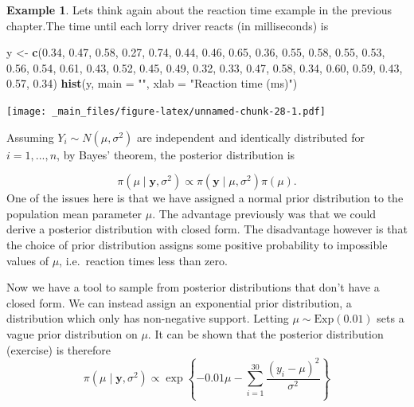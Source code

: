 \documentclass[
]{book}
\newenvironment{Shaded}{\begin{snugshade}}{\end{snugshade}}
\newcommand{\AttributeTok}[1]{\textcolor[rgb]{0.13,0.29,0.53}{#1}}
\newcommand{\FloatTok}[1]{\textcolor[rgb]{0.00,0.00,0.81}{#1}}
\newcommand{\FunctionTok}[1]{\textcolor[rgb]{0.13,0.29,0.53}{\textbf{#1}}}
\newcommand{\NormalTok}[1]{#1}
\newcommand{\OtherTok}[1]{\textcolor[rgb]{0.56,0.35,0.01}{#1}}
\newcommand{\StringTok}[1]{\textcolor[rgb]{0.31,0.60,0.02}{#1}}
\theoremstyle{definition}
\theoremstyle{definition}
\newtheorem{example}{Example}[chapter]
\theoremstyle{definition}
\theoremstyle{definition}
\theoremstyle{remark}
\begin{document}
\begin{example}
\protect\hypertarget{exm:norm}{}\label{exm:norm}Lets think again about the reaction time example in the previous chapter.The time until each lorry driver reacts (in milliseconds) is

\begin{Shaded}
\begin{Highlighting}[]
\NormalTok{y }\OtherTok{\textless{}{-}} \FunctionTok{c}\NormalTok{(}\FloatTok{0.34}\NormalTok{, }\FloatTok{0.47}\NormalTok{, }\FloatTok{0.58}\NormalTok{, }\FloatTok{0.27}\NormalTok{, }\FloatTok{0.74}\NormalTok{, }\FloatTok{0.44}\NormalTok{, }\FloatTok{0.46}\NormalTok{, }\FloatTok{0.65}\NormalTok{, }\FloatTok{0.36}\NormalTok{, }\FloatTok{0.55}\NormalTok{, }\FloatTok{0.58}\NormalTok{, }\FloatTok{0.55}\NormalTok{, }
       \FloatTok{0.53}\NormalTok{, }\FloatTok{0.56}\NormalTok{, }\FloatTok{0.54}\NormalTok{, }\FloatTok{0.61}\NormalTok{, }\FloatTok{0.43}\NormalTok{, }\FloatTok{0.52}\NormalTok{, }\FloatTok{0.45}\NormalTok{, }\FloatTok{0.49}\NormalTok{, }\FloatTok{0.32}\NormalTok{, }\FloatTok{0.33}\NormalTok{, }\FloatTok{0.47}\NormalTok{, }\FloatTok{0.58}\NormalTok{, }
       \FloatTok{0.34}\NormalTok{, }\FloatTok{0.60}\NormalTok{, }\FloatTok{0.59}\NormalTok{, }\FloatTok{0.43}\NormalTok{, }\FloatTok{0.57}\NormalTok{, }\FloatTok{0.34}\NormalTok{)}
\FunctionTok{hist}\NormalTok{(y, }\AttributeTok{main =} \StringTok{""}\NormalTok{, }\AttributeTok{xlab =} \StringTok{"Reaction time (ms)"}\NormalTok{)}
\end{Highlighting}
\end{Shaded}

\texttt{[image: \_main\_files/figure-latex/unnamed-chunk-28-1.pdf]}

Assuming \(Y_i \sim N(\mu, \sigma^2)\) are independent and identically distributed for \(i=1,...,n\), by Bayes' theorem, the posterior distribution is

\[
\pi(\mu \mid \boldsymbol{y}, \sigma^2) \propto \pi(\boldsymbol{y} \mid \mu, \sigma^2) \pi(\mu).
\]
One of the issues here is that we have assigned a normal prior distribution to the population mean parameter \(\mu\). The advantage previously was that we could derive a posterior distribution with closed form. The disadvantage however is that the choice of prior distribution assigns some positive probability to impossible values of \(\mu\), i.e.~reaction times less than zero.

Now we have a tool to sample from posterior distributions that don't have a closed form. We can instead assign an exponential prior distribution, a distribution which only has non-negative support. Letting \(\mu \sim \textrm{Exp}(0.01)\) sets a vague prior distribution on \(\mu\). It can be shown that the posterior distribution (exercise) is therefore
\[
\pi(\mu \mid \boldsymbol{y}, \sigma^2) \propto \exp\left\{-0.01\mu -\sum_{i=1}^{30}\frac{(y_i - \mu)^2}{\sigma^2}\right\} 
\]


\end{example}
\end{document}
